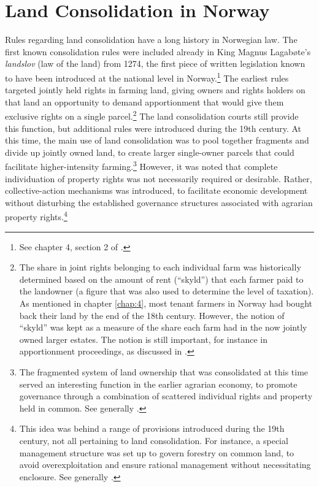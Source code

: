 
\section{Land Consolidation in Norway}\label{sec:6:3}

Rules regarding land consolidation have a long history in Norwegian law. The first known consolidation rules were included already in King Magnus Lagabøte's \emph{landslov} (law of the land) from 1274, the first piece of written legislation known to have been introduced at the national level in Norway.\footnote{See chapter 4, section 2 of \cite{nou02}.} The earliest rules targeted jointly held rights in farming land, giving owners and rights holders on that land an opportunity to demand apportionment that would give them exclusive rights on a single parcel.\footnote{The share in joint rights belonging to each individual farm was historically determined based on the amount of rent (``skyld'') that each farmer paid to the landowner (a figure that was also used to determine the level of taxation). As mentioned in chapter \ref{chap:4}, most tenant farmers in Norway had bought back their land by the end of the 18th century. However, the notion of ``skyld'' was kept as a measure of the share each farm had in the now jointly owned larger estates. The notion is still important, for instance in apportionment proceedings, as discussed in \cite{ravna09a}.} The land consolidation courts still provide this function, but additional rules were introduced during the 19th century. At this time, the main use of land consolidation was to pool together fragments and divide up jointly owned land, to create larger single-owner parcels that could facilitate higher-intensity farming.\footnote{The fragmented system of land ownership that was consolidated at this time served an interesting function in the earlier agrarian economy, to promote governance through a combination of scattered individual rights and property held in common. See generally \cite{smith00,smith02}.} However, it was noted that complete individuation of property rights was not necessarily required or desirable. Rather, collective-action mechanisms was introduced, to facilitate economic development without disturbing the established governance structures associated with agrarian property rights.\footnote{This idea was behind a range of provisions introduced during the 19th century, not all pertaining to land consolidation. For instance, a special management structure was set up to govern forestry on common land, to avoid overexploitation and ensure rational management without necessitating enclosure. See generally \cite{stenseth10a}.}

